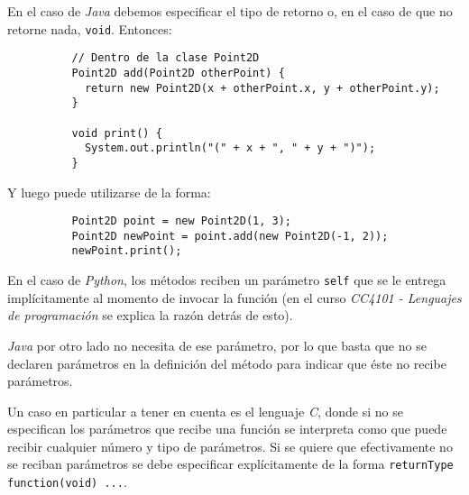       En el caso de \textit{Java} debemos especificar el tipo de retorno o, en el caso de 
      que no retorne nada, \texttt{void}.
      Entonces:

      \begin{listing}[ht!]
        \begin{verbatim}
          // Dentro de la clase Point2D
          Point2D add(Point2D otherPoint) {
            return new Point2D(x + otherPoint.x, y + otherPoint.y);
          }

          void print() {
            System.out.println("(" + x + ", " + y + ")");
          }
        \end{verbatim}
      \end{listing}

      Y luego puede utilizarse de la forma:

      \begin{listing}[ht!]
        \begin{verbatim}
          Point2D point = new Point2D(1, 3);
          Point2D newPoint = point.add(new Point2D(-1, 2));
          newPoint.print();
        \end{verbatim}
      \end{listing}

      \begin{note}
        En el caso de \textit{Python}, los métodos reciben un parámetro 
        \texttt{self} que se le entrega implícitamente al momento de invocar 
        la función (en el curso \textit{CC4101 - Lenguajes de programación} se explica la 
        razón detrás de esto).

        \textit{Java} por otro lado no necesita de ese parámetro, por lo que basta que no
        se declaren parámetros en la definición del método para indicar que éste no recibe
        parámetros.
        
        Un caso en particular a tener en cuenta es el lenguaje \textit{C}, donde si no se 
        especifican los parámetros que recibe una función se interpreta como que puede 
        recibir cualquier número y tipo de parámetros.
        Si se quiere que efectivamente no se reciban parámetros se debe especificar 
        explícitamente de la forma \texttt{returnType function(void) {...}}.
      \end{note}

